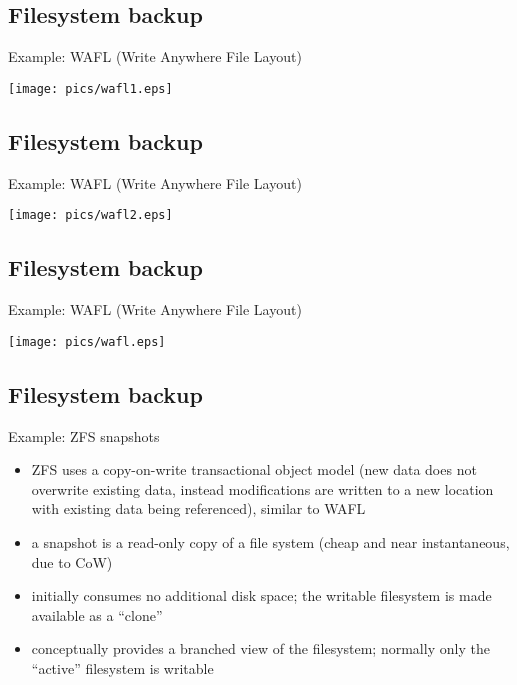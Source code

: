 \documentclass[xga]{xdvislides}
\begin{document}
\subsection{Filesystem backup}
Example: WAFL (Write Anywhere File Layout)
\vspace*{\fill}
\begin{center}
	\texttt{[image: pics/wafl1.eps]}
\end{center}
\vspace*{\fill}


\subsection{Filesystem backup}
Example: WAFL (Write Anywhere File Layout)
\vspace*{\fill}
\begin{center}
	\texttt{[image: pics/wafl2.eps]}
\end{center}
\vspace*{\fill}


\subsection{Filesystem backup}
Example: WAFL (Write Anywhere File Layout)
\vspace*{\fill}
\begin{center}
	\texttt{[image: pics/wafl.eps]}
\end{center}
\vspace*{\fill}


\subsection{Filesystem backup}
Example: ZFS snapshots
\begin{itemize}
	\item ZFS uses a copy-on-write transactional object model (new data does
		not overwrite existing data, instead modifications are written to a
		new location with existing data being referenced), similar to WAFL
	\item a snapshot is a read-only copy of a file system (cheap and near
		instantaneous, due to CoW)
	\item initially consumes no additional disk space; the writable filesystem
		is made available as a ``clone''
	\item conceptually provides a branched view of the filesystem; normally
		only the ``active'' filesystem is writable
\end{itemize}
\end{document}
